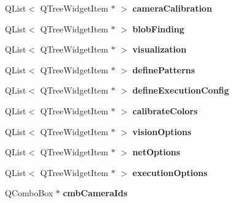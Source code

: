 \begin{DoxyCompactItemize}
\item 
Q\+List$<$ Q\+Tree\+Widget\+Item $\ast$ $>$ {\bfseries camera\+Calibration}\hypertarget{classMainWindow_ae9035f46a000100ab63f1120ca24fe6c}{}\label{classMainWindow_ae9035f46a000100ab63f1120ca24fe6c}

\item 
Q\+List$<$ Q\+Tree\+Widget\+Item $\ast$ $>$ {\bfseries blob\+Finding}\hypertarget{classMainWindow_a775aad7d368aa4c677f29dfca49a0ad3}{}\label{classMainWindow_a775aad7d368aa4c677f29dfca49a0ad3}

\item 
Q\+List$<$ Q\+Tree\+Widget\+Item $\ast$ $>$ {\bfseries visualization}\hypertarget{classMainWindow_aa9dda32a86d3b8aa580702e4ff2b38b9}{}\label{classMainWindow_aa9dda32a86d3b8aa580702e4ff2b38b9}

\item 
Q\+List$<$ Q\+Tree\+Widget\+Item $\ast$ $>$ {\bfseries define\+Patterns}\hypertarget{classMainWindow_ad3cbf1c79dc9d0902d62c8a93cdb2858}{}\label{classMainWindow_ad3cbf1c79dc9d0902d62c8a93cdb2858}

\item 
Q\+List$<$ Q\+Tree\+Widget\+Item $\ast$ $>$ {\bfseries define\+Execution\+Config}\hypertarget{classMainWindow_a686866bc623187ded39b2437a8201a7c}{}\label{classMainWindow_a686866bc623187ded39b2437a8201a7c}

\item 
Q\+List$<$ Q\+Tree\+Widget\+Item $\ast$ $>$ {\bfseries calibrate\+Colors}\hypertarget{classMainWindow_af628c14836088c853d902d7691161ed4}{}\label{classMainWindow_af628c14836088c853d902d7691161ed4}

\item 
Q\+List$<$ Q\+Tree\+Widget\+Item $\ast$ $>$ {\bfseries vision\+Options}\hypertarget{classMainWindow_a900f4c07ecd31f033fc927ec8d3f4095}{}\label{classMainWindow_a900f4c07ecd31f033fc927ec8d3f4095}

\item 
Q\+List$<$ Q\+Tree\+Widget\+Item $\ast$ $>$ {\bfseries net\+Options}\hypertarget{classMainWindow_abe03fbb5ec71af5ebe78e6d350ff8610}{}\label{classMainWindow_abe03fbb5ec71af5ebe78e6d350ff8610}

\item 
Q\+List$<$ Q\+Tree\+Widget\+Item $\ast$ $>$ {\bfseries execution\+Options}\hypertarget{classMainWindow_a07d591054dc439139f26228f13e08d16}{}\label{classMainWindow_a07d591054dc439139f26228f13e08d16}

\item 
Q\+Combo\+Box $\ast$ {\bfseries cmb\+Camera\+Ids}\hypertarget{classMainWindow_ab31fbf0f301d3b11b4f37acd22acae75}{}\label{classMainWindow_ab31fbf0f301d3b11b4f37acd22acae75}


\end{DoxyCompactItemize}
